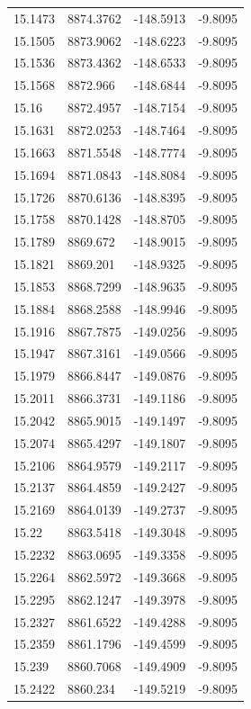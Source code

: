 \begin{table}[H]
\begin{tabular}{llll}
15.1473 & 8874.3762 & -148.5913 & -9.8095 \\
15.1505 & 8873.9062 & -148.6223 & -9.8095 \\
15.1536 & 8873.4362 & -148.6533 & -9.8095 \\
15.1568 & 8872.966 & -148.6844 & -9.8095 \\
15.16 & 8872.4957 & -148.7154 & -9.8095 \\
15.1631 & 8872.0253 & -148.7464 & -9.8095 \\
15.1663 & 8871.5548 & -148.7774 & -9.8095 \\
15.1694 & 8871.0843 & -148.8084 & -9.8095 \\
15.1726 & 8870.6136 & -148.8395 & -9.8095 \\
15.1758 & 8870.1428 & -148.8705 & -9.8095 \\
15.1789 & 8869.672 & -148.9015 & -9.8095 \\
15.1821 & 8869.201 & -148.9325 & -9.8095 \\
15.1853 & 8868.7299 & -148.9635 & -9.8095 \\
15.1884 & 8868.2588 & -148.9946 & -9.8095 \\
15.1916 & 8867.7875 & -149.0256 & -9.8095 \\
15.1947 & 8867.3161 & -149.0566 & -9.8095 \\
15.1979 & 8866.8447 & -149.0876 & -9.8095 \\
15.2011 & 8866.3731 & -149.1186 & -9.8095 \\
15.2042 & 8865.9015 & -149.1497 & -9.8095 \\
15.2074 & 8865.4297 & -149.1807 & -9.8095 \\
15.2106 & 8864.9579 & -149.2117 & -9.8095 \\
15.2137 & 8864.4859 & -149.2427 & -9.8095 \\
15.2169 & 8864.0139 & -149.2737 & -9.8095 \\
15.22 & 8863.5418 & -149.3048 & -9.8095 \\
15.2232 & 8863.0695 & -149.3358 & -9.8095 \\
15.2264 & 8862.5972 & -149.3668 & -9.8095 \\
15.2295 & 8862.1247 & -149.3978 & -9.8095 \\
15.2327 & 8861.6522 & -149.4288 & -9.8095 \\
15.2359 & 8861.1796 & -149.4599 & -9.8095 \\
15.239 & 8860.7068 & -149.4909 & -9.8095 \\
15.2422 & 8860.234 & -149.5219 & -9.8095 \\

\end{tabular}
\end{table}
